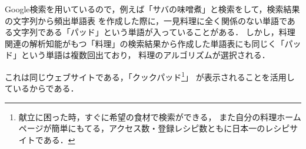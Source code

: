 Google検索を用いているので，例えば「サバの味噌煮」と検索をして，検索結果の文字列から頻出単語表
を作成した際に，一見料理に全く関係のない単語である文字列である「パッド」という単語が入っていることがある．
しかし，料理関連の解析知能がもつ「料理」の検索結果から作成した単語表にも同じく「パッド」という単語は複数回出ており，
料理のアルゴリズムが選択される．

これは同じウェブサイトである，「クックパッド\footnote{献立に困った時，すぐに希望の食材で検索ができる，
また自分の料理ホームページが簡単にもてる，アクセス数・登録レシピ数ともに日本一のレシピサイトである．}」
が表示されることを活用しているからである．